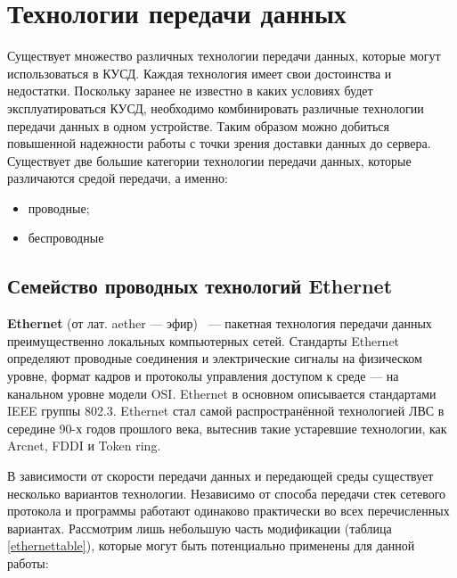 \section{Технологии передачи данных}

Существует множество различных технологии передачи данных, которые могут использоваться в КУСД. Каждая технология имеет свои достоинства и недостатки. Поскольку заранее не известно в каких условиях будет эксплуатироваться КУСД, необходимо комбинировать различные технологии передачи данных в одном устройстве. Таким образом можно добиться повышенной надежности работы с точки зрения доставки данных до сервера. Существует две большие категории технологии передачи данных, которые различаются средой передачи, а именно:
\begin{itemize}
\item проводные;
\item беспроводные
\end{itemize}

\subsection{Семейство проводных технологий Ethernet}

\textbf{Ethernet} (от лат. aether --- эфир) ~--- пакетная технология передачи данных преимущественно локальных компьютерных сетей. Стандарты Ethernet определяют проводные соединения и электрические сигналы на физическом уровне, формат кадров и протоколы управления доступом к среде — на канальном уровне модели OSI. Ethernet в основном описывается стандартами IEEE группы 802.3. Ethernet стал самой распространённой технологией ЛВС в середине 90-х годов прошлого века, вытеснив такие устаревшие технологии, как Arcnet, FDDI и Token ring\cite{ethernetinfo}.

В зависимости от скорости передачи данных и передающей среды существует несколько вариантов технологии. Независимо от способа передачи стек сетевого протокола и программы работают одинаково практически во всех перечисленных вариантах. Рассмотрим лишь небольшую часть модификации (таблица \ref{ethernettable}), которые могут быть потенциально применены для данной работы:


